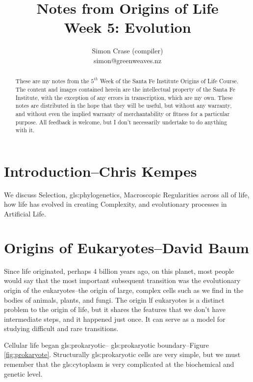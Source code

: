 \documentclass[]{article}
\title{
	Notes from Origins of Life\\
	Week 5: Evolution}
\author{Simon Crase (compiler)\\simon@greenweaves.nz}
\begin{document}
\maketitle

\begin{abstract}
   These are my notes from the $5^{th}$ Week of the Santa Fe Institute Origins of Life Course\cite{sfi2020}. 
   The content and images contained herein are the intellectual property of the Santa Fe Institute, with the exception of any errors in transcription, which are my own.
   These notes are distributed in the hope that they will be useful,
   but without any warranty, and without even the implied warranty of
   merchantability or fitness for a particular purpose. All feedback is welcome,
   but I don't necessarily undertake to do anything with it.
\end{abstract}

\setcounter{tocdepth}{2}
\tableofcontents
\listoffigures

\section[Introduction]{Introduction--Chris Kempes}

We discuss Selection, \gls{gls:phylogenetics}, Macroscopic Regularities across all of life, how  life has evolved in creating Complexity, and evolutionary processes in Artificial Life. 

\section[Origins of Eukaryotes]{Origins of Eukaryotes--David Baum}

Since life originated, perhaps 4 billion years ago, on this planet, most people would say that the most important subsequent transition was the evolutionary origin of the eukaryotes--the origin of large, complex cells such as we find in the bodies of animals, plants, and fungi. The origin lf eukaryotes is a distinct problem to the origin of life, but it shares the features that we don't have intermediate steps, and it happened just once. It can serve as a model for studying difficult and rare transitions.

Cellular life began \gls{gls:prokaryotic}-- \glsdesc{gls:prokaryotic}
boundary--Figure \ref{fig:prokaryote}. Structurally \gls{gls:prokaryotic} cells are very simple, but we must remember that the \gls{gls:cytoplasm} is very complicated at the biochemical and genetic level.
\end{document}
